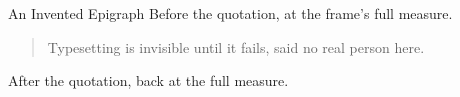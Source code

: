\documentclass{slides}
\begin{document}
\begin{frame}{An Invented Epigraph}
Before the quotation, at the frame's full measure.
\begin{quote}
Typesetting is invisible until it fails, said no real person here.
\end{quote}
After the quotation, back at the full measure.
\end{frame}
\end{document}
